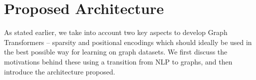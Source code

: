 \documentclass[letterpaper]{article} %
\begin{document}




\section{Proposed Architecture}
As stated earlier, we take into account two key aspects to develop Graph Transformers -- sparsity and positional encodings which should ideally be used in the best possible way for learning on graph datasets. We first discuss the motivations behind these using a transition from NLP to graphs, and then introduce the architecture proposed.
\end{document}

